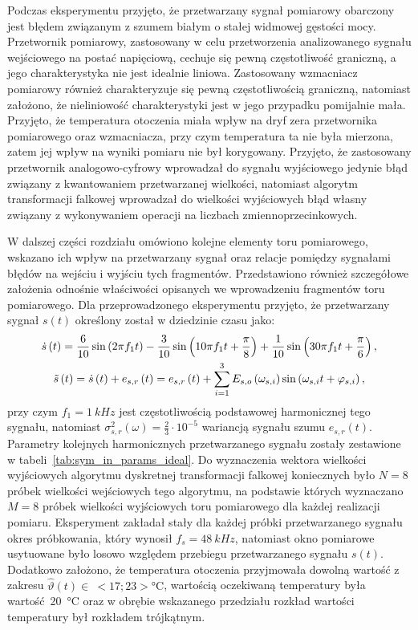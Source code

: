 Podczas eksperymentu przyjęto, że przetwarzany sygnał pomiarowy obarczony jest błędem związanym z szumem białym o stałej widmowej gęstości mocy. Przetwornik pomiarowy, zastosowany w celu przetworzenia analizowanego sygnału wejściowego na postać napięciową, cechuje się pewną częstotliwość graniczną, a jego charakterystyka nie jest idealnie liniowa. Zastosowany wzmacniacz pomiarowy również charakteryzuje się pewną częstotliwością graniczną, natomiast założono, że nieliniowość charakterystyki jest w jego przypadku pomijalnie mała. Przyjęto, że temperatura otoczenia miała wpływ na dryf zera przetwornika pomiarowego oraz wzmacniacza, przy czym temperatura ta nie była mierzona, zatem jej wpływ na wyniki pomiaru nie był korygowany. Przyjęto, że zastosowany przetwornik analogowo-cyfrowy wprowadzał do sygnału wyjściowego jedynie błąd związany z kwantowaniem przetwarzanej wielkości, natomiast algorytm transformacji falkowej wprowadzał do wielkości wyjściowych błąd własny związany z wykonywaniem operacji na liczbach zmiennoprzecinkowych.

W dalszej części rozdziału omówiono kolejne elementy toru pomiarowego, wskazano ich wpływ na przetwarzany sygnał oraz relacje pomiędzy sygnałami błędów na wejściu i wyjściu tych fragmentów. Przedstawiono również szczegółowe założenia odnośnie właściwości opisanych we wprowadzeniu fragmentów toru pomiarowego. Dla przeprowadzonego eksperymentu przyjęto, że przetwarzany sygnał $s(t)$ określony został w dziedzinie czasu jako:
\begin{gather}
\dot{s} \left(t\right) = \frac{6}{10} \sin \left( 2 \pi f_{1} t \right) - \frac{3}{10} \sin \left( 10 \pi f_{1} t + \frac{\pi}{8} \right) + \frac{1}{10} \sin \left( 30 \pi f_{1} t + \frac{\pi}{6} \right) \label{eq:sym_in_ideal}, \\
\tilde{s} \left(t\right) = \dot{s} \left(t\right) + e_{s,r} \left(t\right) = e_{s,r} \left(t\right) + \sum _{i=1} ^{3} E_{s,o} \left(\omega_{s,i}\right) \sin \left(\omega_{s,i} t + \varphi_{s,i}\right) \label{eq:sym_in_real},
\end{gather}
przy czym $f_{1} = \qty{1}{kHz}$ jest częstotliwością podstawowej harmonicznej tego sygnału, natomiast $\sigma_{s,r}^{2}(\omega) = \frac{2}{3} \cdot 10^{-5}$ wariancją sygnału szumu $e_{s,r}(t)$. Parametry kolejnych harmonicznych przetwarzanego sygnału zostały zestawione w tabeli~\ref{tab:sym_in_params_ideal}. Do wyznaczenia wektora wielkości wyjściowych algorytmu dyskretnej transformacji falkowej koniecznych było $N = 8$ próbek wielkości wejściowych tego algorytmu, na podstawie których wyznaczano $M = 8$ próbek wielkości wyjściowych toru pomiarowego dla każdej realizacji pomiaru. Eksperyment zakładał stały dla każdej próbki przetwarzanego sygnału okres próbkowania, który wynosił $f_{s} = \qty{48}{kHz}$, natomiast okno pomiarowe usytuowane było losowo względem przebiegu przetwarzanego sygnału $s(t)$. Dodatkowo założono, że temperatura otoczenia przyjmowała dowolną wartość z zakresu $\hat{\vartheta}(t)\in~<17;23>\unit{\degreeCelsius}$, wartością oczekiwaną temperatury była wartość~\qty{20}{\degreeCelsius} oraz w obrębie wskazanego przedziału rozkład wartości temperatury był rozkładem trójkątnym.

